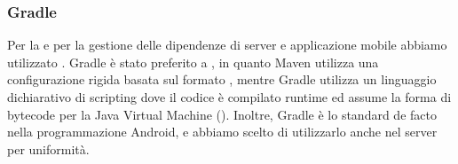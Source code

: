 \documentclass[../../manuale-manutentore.tex]{subfiles}
\begin{document}
\subsubsection{Gradle}%
\label{subs:gradle}

Per la  e per la gestione delle dipendenze di server e applicazione mobile abbiamo utilizzato .
Gradle è stato preferito a , in quanto Maven utilizza una configurazione rigida basata sul formato , mentre Gradle utilizza un linguaggio dichiarativo di scripting  dove il codice è compilato runtime ed assume la forma di bytecode per la Java Virtual Machine ().
Inoltre, Gradle è lo standard de facto nella programmazione Android, e abbiamo scelto di utilizzarlo anche nel server per uniformità.
\end{document}
